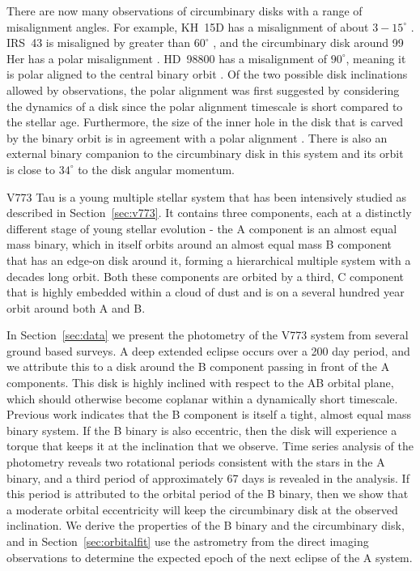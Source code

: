 \documentclass{aa}
\begin{document}
There are now many observations of circumbinary disks with a range of misalignment angles.
%
For example, KH~15D has a misalignment of about $3-15^\circ$ \citep{Chiang2004, Winn2004,Capelo2012,Poon2021}.
%
IRS~43 is misaligned by greater than $60^\circ$ \citep{Brinch16}, and the circumbinary disk around 99 Her has a polar misalignment \citep{Kennedy12}.
%
HD~98800 has a misalignment of $90^\circ$, meaning it is polar aligned to the central binary orbit \citep{Kennedy19,Zuniga-Fernandez21}.
%
Of the two possible disk inclinations allowed by observations, the polar alignment was first suggested by considering the dynamics of a disk since the polar alignment timescale is short compared to the stellar age.
%
Furthermore, the size of the inner hole in the disk that is carved by the binary orbit \citep{Artymowicz1994} is in agreement with a polar alignment \citep{Franchini19}.
%
There is also an external binary companion to the circumbinary disk in this system and its orbit is close to $34^\circ$ to the disk angular momentum.

V773 Tau is a young multiple stellar system that has been intensively studied as described in Section~\ref{sec:v773}.
%
It contains three components, each at a distinctly different stage of young stellar evolution - the A component is an almost equal mass binary, which in itself orbits around an almost equal mass B component that has an edge-on disk around it, forming a hierarchical multiple system with a decades long orbit.
%
Both these components are orbited by a third, C component that is highly embedded within a cloud of dust and is on a several hundred year orbit around both A and B.
%

In Section~\ref{sec:data} we present the photometry of the V773 system from several ground based surveys.
%
A deep extended eclipse occurs over a 200 day period, and we attribute this to a disk around the B component passing in front of the A components.
%
This disk is highly inclined with respect to the AB orbital plane, which should otherwise become coplanar within a dynamically short timescale.
%
Previous work \citep{Boden12} indicates that the B component is itself a tight, almost equal mass binary system.
%
If the B binary is also eccentric, then the disk will experience a torque that keeps it at the inclination that we observe.
%
Time series analysis of the photometry reveals two rotational periods consistent with the stars in the A binary, and a third period of approximately 67 days is revealed in the analysis.
%
If this period is attributed to the orbital period of the B binary, then we show that a moderate orbital eccentricity will keep the circumbinary disk at the observed inclination.
%
We derive the properties of the B binary and the circumbinary disk, and in Section~\ref{sec:orbitalfit} use the astrometry from the direct imaging observations to determine the expected epoch of the next eclipse of the A system.
\end{document}

